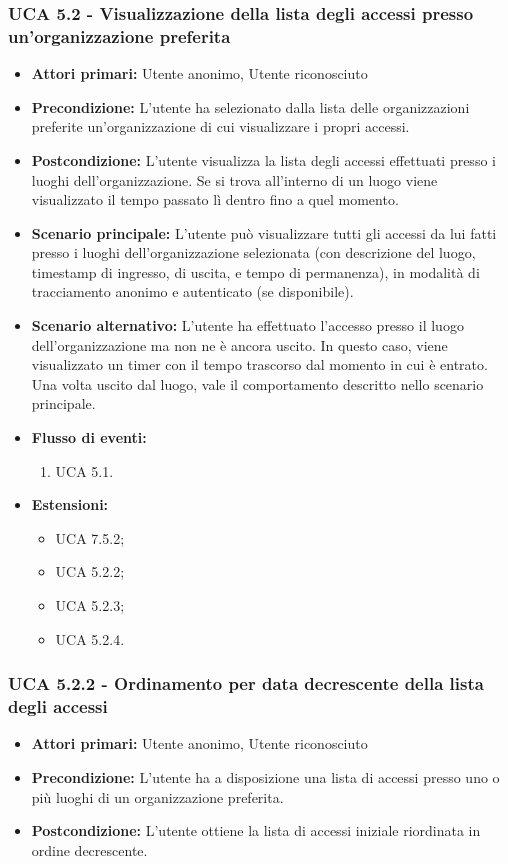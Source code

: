 \subsubsection{UCA 5.2 - Visualizzazione della lista degli accessi presso un'organizzazione preferita}
\begin{itemize}
    \item \textbf{Attori primari:} Utente anonimo, Utente riconosciuto
    \item \textbf{Precondizione:} L'utente ha selezionato dalla lista delle organizzazioni preferite un'organizzazione di cui visualizzare i propri accessi.
    \item \textbf{Postcondizione:} L'utente visualizza la lista degli accessi effettuati presso i luoghi dell'organizzazione. Se si trova all'interno di un luogo viene visualizzato il tempo passato lì dentro fino a quel momento.
    \item \textbf{Scenario principale:} L'utente può visualizzare tutti gli accessi da lui fatti presso i luoghi dell'organizzazione selezionata (con descrizione del luogo, timestamp di ingresso, di uscita, e tempo di permanenza), in modalità di tracciamento anonimo e autenticato (se disponibile).
    \item \textbf{Scenario alternativo:} L'utente ha effettuato l'accesso presso il luogo dell'organizzazione ma non ne è ancora uscito. In questo caso, viene visualizzato un timer con il tempo trascorso dal momento in cui è entrato.
    Una volta uscito dal luogo, vale il comportamento descritto nello scenario principale.
    \item \textbf{Flusso di eventi:}
    \begin{enumerate}
        \item UCA 5.1.
    \end{enumerate}
    \item \textbf{Estensioni:}
    \begin{itemize}
        \item UCA 7.5.2;
        \item UCA 5.2.2;
        \item UCA 5.2.3;
        \item UCA 5.2.4.
    \end{itemize}
\end{itemize}

\subsubsection{UCA 5.2.2 - Ordinamento per data decrescente della lista degli accessi}
\begin{itemize}
    \item \textbf{Attori primari:} Utente anonimo, Utente riconosciuto
    \item \textbf{Precondizione:} L'utente ha a disposizione una lista di accessi presso uno o più luoghi di un organizzazione preferita.
    \item \textbf{Postcondizione:} L'utente ottiene la lista di accessi iniziale riordinata in ordine decrescente.
\end{itemize}

